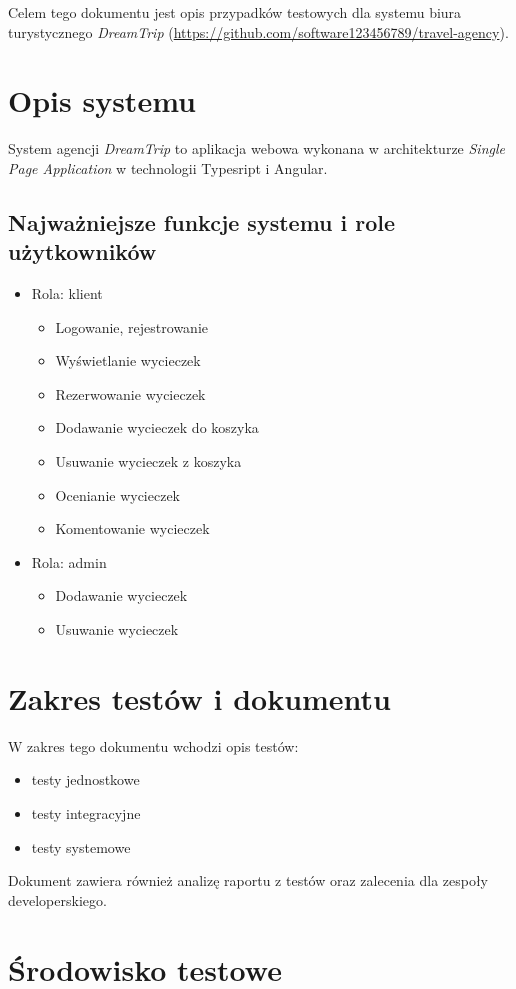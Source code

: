 \documentclass[a4paper,15pt]{article}
\begin{document}
Celem tego dokumentu jest opis przypadków testowych dla systemu biura turystycznego \textit{DreamTrip} (\url{https://github.com/software123456789/travel-agency}). 

\section{Opis systemu}
System agencji \textit{DreamTrip} to aplikacja webowa wykonana w architekturze \textit{Single Page Application} w technologii Typesript i Angular. 
\subsection{Najważniejsze funkcje systemu i role użytkowników} 

\begin{itemize}
\item Rola: klient
\begin{itemize}
\item Logowanie, rejestrowanie
\item Wyświetlanie wycieczek
\item Rezerwowanie wycieczek
\item Dodawanie wycieczek do koszyka
\item Usuwanie wycieczek z koszyka
\item Ocenianie wycieczek
\item Komentowanie wycieczek
\end{itemize} 
\item Rola: admin
\begin{itemize}
\item Dodawanie wycieczek
\item Usuwanie wycieczek
\end{itemize} 
\end{itemize}

\section{Zakres testów i dokumentu}
W zakres tego dokumentu wchodzi opis testów:
\begin{itemize}
\item testy jednostkowe 
\item testy integracyjne
\item testy systemowe
\end{itemize}  
Dokument zawiera również analizę raportu z testów oraz zalecenia dla zespoły developerskiego.


\section{Środowisko testowe}
\end{document}
